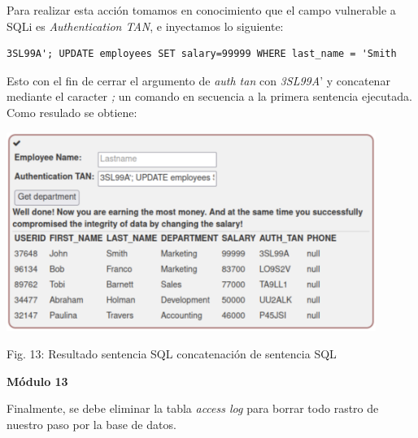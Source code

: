 \documentclass[12pt,oneside,a4paper]{book}
\begin{document}
\begin{enumerate}
\begin{enumerate}
        \vspace{1em}

        \hspace{20pt}
        Para realizar esta acción tomamos en conocimiento que el campo vulnerable a SQLi es \textit{Authentication TAN}, e inyectamos lo siguiente:

        \vspace{1em}
        
        \begin{verbatim}
3SL99A'; UPDATE employees SET salary=99999 WHERE last_name = 'Smith
        \end{verbatim}
        
        \hspace{20pt}
        Esto con el fin de cerrar el argumento de \textit{auth tan} con \textit{3SL99A}' y concatenar mediante el caracter \textit{;} un comando en secuencia a la primera sentencia ejecutada. Como resulado se obtiene:

        \vspace{2em}
        
        \begin{center}
            \includegraphics[width=12cm]{img/sqli10.png}
            
            \vspace{0.1em}
            
            Fig. 13: Resultado sentencia SQL concatenación de sentencia SQL
        \end{center}
        
        \newpage

        \textbf{Módulo 13}
        
        \vspace{1em}

        \hspace{20pt}
        Finalmente, se debe eliminar la tabla \textit{access log} para borrar todo rastro de nuestro paso por la base de datos.


\end{enumerate}
\end{enumerate}
\end{document}
